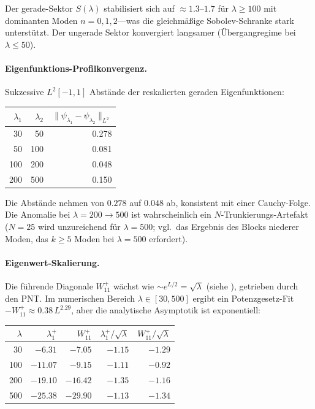 \documentclass[12pt,a4paper]{article}
\theoremstyle{definition}
\theoremstyle{remark}
\begin{document}
\noindent Der gerade-Sektor $S(\lambda)$ stabilisiert sich auf $\approx 1.3$--$1.7$ für $\lambda \geq 100$ mit dominanten Moden $n = 0, 1, 2$---was die gleichmäßige Sobolev-Schranke stark unterstützt. Der ungerade Sektor konvergiert langsamer (Übergangregime bei $\lambda \leq 50$).

\paragraph{Eigenfunktions-Profilkonvergenz.}
Sukzessive $L^2[-1,1]$ Abstände der reskalierten geraden Eigenfunktionen:

\begin{center}
\begin{tabular}{r@{${}\to{}$}r|r}
$\lambda_1$ & $\lambda_2$ & $\|\psi_{\lambda_1} - \psi_{\lambda_2}\|_{L^2}$ \\\hline
30  & 50  & 0.278 \\
50  & 100 & 0.081 \\
100 & 200 & 0.048 \\
200 & 500 & 0.150
\end{tabular}
\end{center}

\noindent Die Abstände nehmen von $0.278$ auf $0.048$ ab, konsistent mit einer Cauchy-Folge. Die Anomalie bei $\lambda = 200 \to 500$ ist wahrscheinlich ein $N$-Trunkierungs-Artefakt ($N = 25$ wird unzureichend für $\lambda = 500$; vgl.\ das Ergebnis des Blocks niederer Moden, das $k \geq 5$ Moden bei $\lambda = 500$ erfordert).

\paragraph{Eigenwert-Skalierung.}
Die führende Diagonale $W_{11}^+$ wächst wie $\sim e^{L/2} = \sqrt{\lambda}$ (siehe ), getrieben durch den PNT. Im numerischen Bereich $\lambda \in [30, 500]$ ergibt ein Potenzgesetz-Fit $-W_{11}^+ \approx 0.38\,L^{2.29}$, aber die analytische Asymptotik ist exponentiell:

\begin{center}
\begin{tabular}{r|r|r|r|r}
$\lambda$ & $\lambda_1^+$ & $W_{11}^+$ & $\lambda_1^+ / \sqrt{\lambda}$ & $W_{11}^+ / \sqrt{\lambda}$ \\\hline
30  & $-6.31$  & $-7.05$  & $-1.15$ & $-1.29$ \\
100 & $-11.07$ & $-9.15$  & $-1.11$ & $-0.92$ \\
200 & $-19.10$ & $-16.42$ & $-1.35$ & $-1.16$ \\
500 & $-25.38$ & $-29.90$ & $-1.13$ & $-1.34$
\end{tabular}
\end{center}
\end{document}
